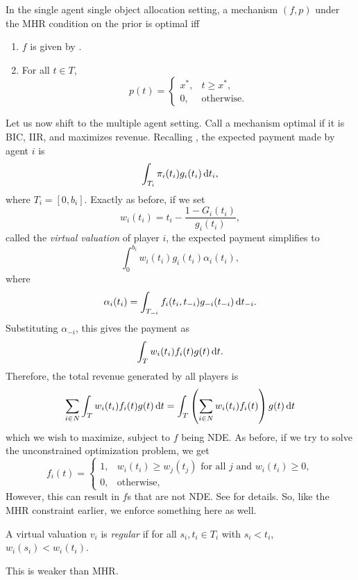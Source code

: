 		\begin{ftheo}
			In the single agent single object allocation setting, a mechanism $(f,p)$ under the MHR condition on the prior is optimal iff
			\begin{enumerate}
				\item $f$ is given by .
				\item For all $t \in T$,
				\[ p(t) = \begin{cases} x^*, & t \ge x^*, \\ 0, & \text{otherwise.} \end{cases} \]
			\end{enumerate}
		\end{ftheo}

		Let us now shift to the multiple agent setting. Call a mechanism optimal if it is BIC, IIR, and maximizes revenue. Recalling , the expected payment made by agent $i$ is
		\[ \int_{T_i} \pi_i(t_i) g_i(t_i) \dif t_i, \]
		where $T_i = [0,b_i]$. Exactly as before, if we set
		\[ w_i(t_i) = t_i - \frac{1-G_i(t_i)}{g_i(t_i)}, \]
		called the \emph{virtual valuation} of player $i$, the expected payment simplifies to
		\[ \int_0^{b_i} w_i(t_i) g_i(t_i) \alpha_i(t_i), \]
		where
		\[ \alpha_i(t_i) = \int_{T_{-i}} f_i(t_i,t_{-i}) g_{-i}(t_{-i}) \dif t_{-i}. \]
		Substituting $\alpha_{-i}$, this gives the payment as
		\[ \int_T w_i(t_i) f_i(t) g(t) \dif t. \]
		Therefore, the total revenue generated by all players is
		\[ \sum_{i \in N} \int_{T} w_i(t_i) f_i(t) g(t) \dif t = \int_{T} \left(\sum_{i \in N} w_i(t_i) f_i(t)\right) g(t) \dif t \]
		which we wish to maximize, subject to $f$ being NDE. As before, if we try to solve the unconstrained optimization problem, we get
		\begin{equation}
			\label{eqn: multi agent optimal}
			f_i(t) = \begin{cases} 1, & w_i(t_i) \ge w_j(t_j) \text{ for all $j$ and $w_i(t_i) \ge 0$}, \\ 0, & \text{otherwise,} \end{cases}
		\end{equation}
		However, this can result in $f$s that are not NDE. See \cite{myerson} for details. So, like the MHR constraint earlier, we enforce something here as well.

		\begin{fdef}
			A virtual valuation $v_i$ is \emph{regular} if for all $s_i,t_i \in T_i$ with $s_i < t_i$, $w_i(s_i) < w_i(t_i)$.
		\end{fdef}
		This is weaker than MHR.

